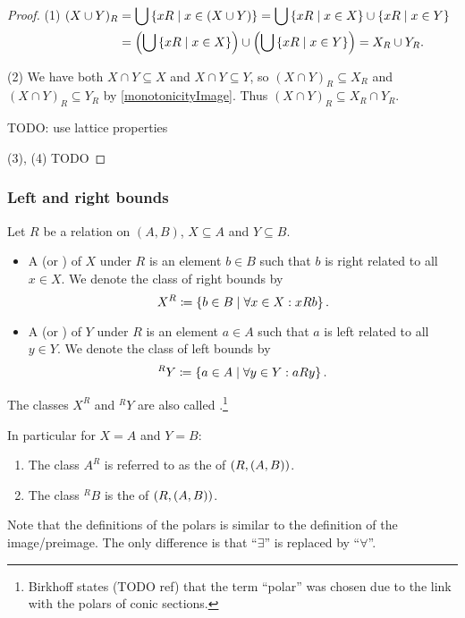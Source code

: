 \begin{proof}\mbox{}

(1) $\begin{aligned}[t]
(X\cup Y)_R &= \bigcup \left\{ xR \;\middle|\; x\in (X\cup Y) \right\} = \bigcup \left\{ xR \;\middle|\; x\in X \right\}\cup \left\{ xR \;\middle|\; x\in Y \right\} \\
&= \left(\bigcup \left\{ xR \;\middle|\; x\in X \right\}\right)\cup \left(\bigcup \left\{ xR \;\middle|\; x\in Y \right\}\right) = X_R \cup Y_R.
\end{aligned}$

(2) We have both $X\cap Y \subseteq X$ and $X\cap Y \subseteq Y$, so $(X\cap Y)_R \subseteq X_R$ and $(X\cap Y)_R \subseteq Y_R$ by \ref{monotonicityImage}. Thus $(X\cap Y)_R \subseteq X_R\cap Y_R$.

TODO: use lattice properties

(3), (4) TODO
\end{proof}


\subsubsection{Left and right bounds}
\begin{definition}
Let $R$ be a relation on $(A, B)$, $X\subseteq A$ and $Y\subseteq B$.
\begin{itemize}
\item A  (or ) of $X$ under $R$ is an element $b\in B$ such that $b$ is right related to all $x\in X$. We denote the class of right bounds by
\[ X^R \coloneqq \left\{ b\in B \;\middle|\; \forall x\in X: xRb \right\}. \]
\item A  (or ) of $Y$ under $R$ is an element $a\in A$ such that $a$ is left related to all $y\in Y$. We denote the class of left bounds by
\[ ^RY \coloneqq \left\{ a\in A \;\middle|\; \forall y\in Y: aRy \right\}. \]
\end{itemize}
The classes $X^R$ and $^RY$ are also called .\footnote{Birkhoff states (TODO ref) that the term ``polar'' was chosen due to the link with the polars of conic sections.}

In particular for $X=A$ and $Y=B$:
\begin{enumerate}
\item The class $A^R$ is referred to as the  of $\left( R,(A,B) \right)$.
\item The class $^RB$ is the  of $\left( R,(A,B) \right)$.
\end{enumerate}
\end{definition}
Note that the definitions of the polars is similar to the definition of the image/preimage. The only difference is that ``$\exists$'' is replaced by ``$\forall$''.

